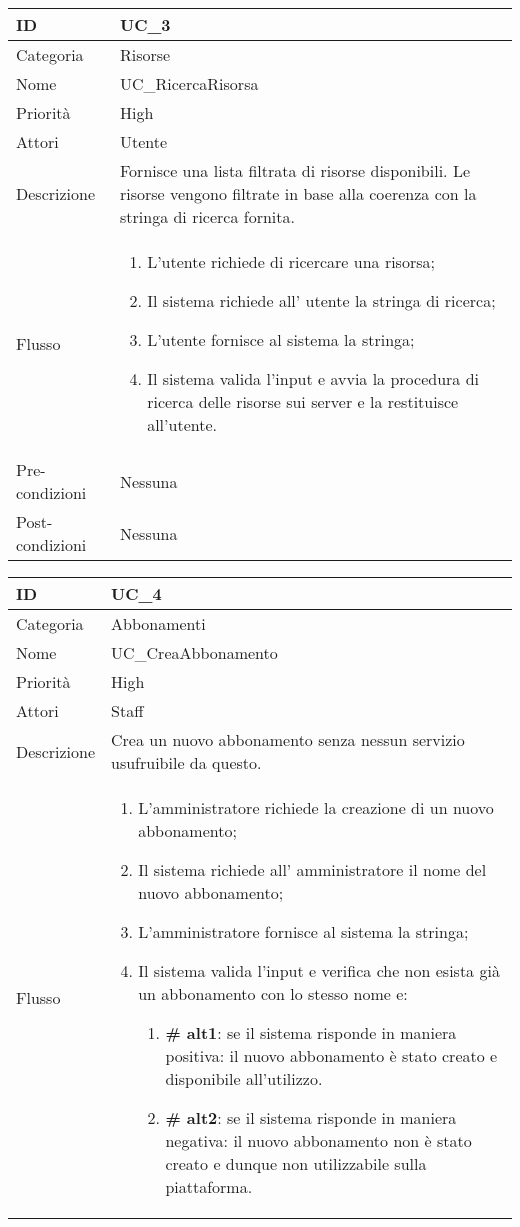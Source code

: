 \begin{center}
\begin{tabular}{ |p{2cm}|p{13cm}|  }
\hline
ID & UC\_3 \\\hline
Categoria & Risorse \\\hline
Nome & UC\_RicercaRisorsa\\\hline
Priorità & High \\\hline
Attori &  Utente \\\hline
Descrizione & Fornisce una lista filtrata di risorse disponibili. Le risorse vengono filtrate in base alla coerenza con la stringa di ricerca fornita.\\\hline
Flusso &  	\begin{enumerate}
			\item L'utente richiede di ricercare una risorsa;
			\item Il sistema richiede all' utente la stringa di ricerca;
			\item L'utente fornisce al sistema la stringa;
			\item Il sistema valida l'input e avvia la procedura di ricerca delle risorse sui server e la restituisce all'utente. %
			
		\end{enumerate}\\\hline
Pre-condizioni &  Nessuna\\\hline
Post-condizioni &  Nessuna\\\hline
\end{tabular}
\label{table_use_case:3}\newline

\begin{tabular}{ |p{2cm}|p{13cm}|  }
\hline
ID & UC\_4 \\\hline
Categoria & Abbonamenti\\\hline
Nome & UC\_CreaAbbonamento\\\hline
Priorità & High \\\hline
Attori &  Staff \\\hline
Descrizione & Crea un nuovo abbonamento senza nessun servizio usufruibile da questo.\\\hline
Flusso &  	\begin{enumerate}
			\item L'amministratore richiede la creazione di un nuovo abbonamento;
			\item Il sistema richiede all' amministratore il nome del nuovo abbonamento;
			\item L'amministratore fornisce al sistema la stringa;
			\item Il sistema valida l'input e verifica che non esista già un abbonamento con lo stesso nome e:
				\begin{enumerate}[  ]
					\item \textbf{\# alt1}: se il sistema risponde in maniera positiva: il nuovo abbonamento è stato creato e disponibile all'utilizzo.
					\item \textbf{\# alt2}: se il sistema risponde in maniera negativa: il nuovo abbonamento non è stato creato e dunque non utilizzabile sulla piattaforma.
				\end{enumerate}
			

\end{enumerate}
\end{tabular}
\end{center}
